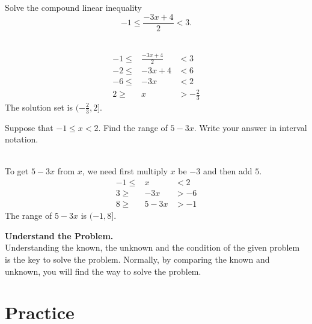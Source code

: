 \documentclass[en,11pt]{elegantbook}
\newcommand{\size}[2]{{\fontsize{#1}{0}\selectfont#2}}
\newenvironment{rmdtip}{
	\vspace*{0.5\baselineskip}
	\par\noindent
	\makebox[-3pt][r]{\color{red!90}\size{12}{\HandRight}\,\,}
    \begin{tcolorbox}[
    enhanced,
    title={\textbf{\color{second}Tips}},
    title style={left color=blue!10!green!20!white,right color=yellow!20!blue!20!white},
    colback=cyan!10!white,
    ]
    \sffamily
}{
    \end{tcolorbox}
    \par\ignorespacesafterend
}
\let\BeginKnitrBlock\begin \let\EndKnitrBlock\end
\begin{document}
\BeginKnitrBlock{example}
\protect\hypertarget{exm:unnamed-chunk-203}{}{\label{exm:unnamed-chunk-203} }
Solve the compound linear inequality
\[
-1\leq \dfrac{-3x+4}{2}<3.
\]
\EndKnitrBlock{example}

\BeginKnitrBlock{solution}
{}\\

\[
\begin{array}{rcl}
    -1\leq & \frac{-3x+4}{2}  & <3        \\
    -2\leq & -3x+4          & <6        \\
    -6\leq & -3x           & <2        \\
    2\geq  & x            & >-\frac23
\end{array}
\]
The solution set is \((-\frac23, 2]\).
\EndKnitrBlock{solution}

\BeginKnitrBlock{example}
\protect\hypertarget{exm:unnamed-chunk-205}{}{\label{exm:unnamed-chunk-205} }
Suppose that \(-1\le x < 2\). Find the range of \(5-3x\). Write your answer in interval notation.
\EndKnitrBlock{example}

\BeginKnitrBlock{solution}
{}\\

To get \(5-3x\) from \(x\), we need first multiply \(x\) be \(-3\) and then add \(5\).
\[
\begin{array}{rcl}
-1\leq & x          & < 2        \\
3\geq & -3x         & >-6        \\
8\geq & 5-3x      & >-1
\end{array}
\]
The range of \(5-3x\) is \((-1, 8]\).
\EndKnitrBlock{solution}

\begin{rmdtip}

\textbf{Understand the Problem.}\\
Understanding the known, the unknown and the condition of the given problem is the key to solve the problem. Normally, by comparing the known and unknown, you will find the way to solve the problem.

\end{rmdtip}

\newpage

\hypertarget{practice-9}{%
\section{Practice}\label{practice-9}}
\end{document}
